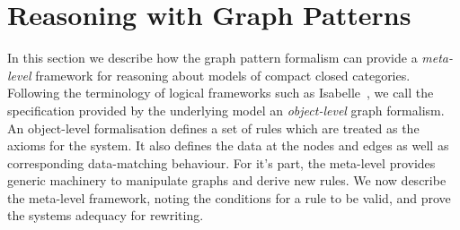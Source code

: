 \documentclass[runningheads]{llncs}
\newcommand{\binterp}[1]{\llbracket #1 \rrbracket_!}
\begin{document}
%
%

%








\section{Reasoning with Graph Patterns}
\label{sec:rewriting}

In this section we describe how the graph pattern formalism can
provide a \emph{meta-level} framework for reasoning about models of
compact closed categories. Following the terminology of logical
frameworks such as Isabelle~\cite{isabelle}, we call the specification
provided by the underlying model an \emph{object-level} graph
formalism. An object-level formalisation defines a set of rules which
are treated as the axioms for the system. It also defines the data at
the nodes and edges as well as corresponding data-matching behaviour.
For it's part, the meta-level provides generic machinery to manipulate
graphs and derive new rules. We now describe the meta-level framework,
noting the conditions for a rule to be valid, and prove the systems
adequacy for rewriting.
\end{document}
